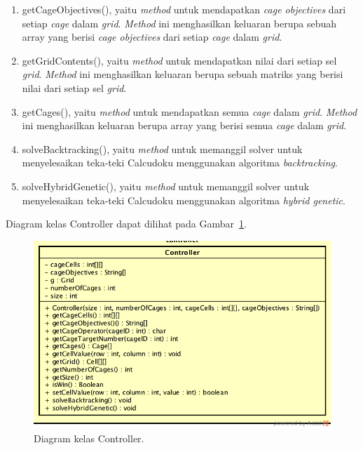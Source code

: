 \begin{enumerate}
\item getCageObjectives(), yaitu \textit{method} untuk mendapatkan \textit{cage objectives} dari setiap \textit{cage} dalam \textit{grid}. \textit{Method} ini menghasilkan keluaran berupa sebuah array yang berisi \textit{cage objectives} dari setiap \textit{cage} dalam \textit{grid}.
\item getGridContents(), yaitu \textit{method} untuk mendapatkan nilai dari setiap sel \textit{grid}. \textit{Method} ini menghasilkan keluaran berupa sebuah matriks yang berisi nilai dari setiap sel \textit{grid}.
\item getCages(), yaitu \textit{method} untuk mendapatkan semua \textit{cage} dalam \textit{grid}. \textit{Method} ini menghasilkan keluaran berupa array yang berisi semua \textit{cage} dalam \textit{grid}.
\item solveBacktracking(), yaitu \textit{method} untuk memanggil solver untuk menyelesaikan teka-teki Calcudoku menggunakan algoritma \textit{backtracking}. 
\item solveHybridGenetic(), yaitu \textit{method} untuk memanggil solver untuk menyelesaikan teka-teki Calcudoku menggunakan algoritma \textit{hybrid genetic}. 
\end{enumerate}

Diagram kelas Controller dapat dilihat pada Gambar~\ref{fig:diagramkelascontroller}.

\begin{figure}
\centering
\captionsetup{justification=centering}
\includegraphics[scale=0.5]{Gambar/Perancangan/DiagramKelasController.png}
\caption[Diagram kelas Controller.]{Diagram kelas Controller.}
\label{fig:diagramkelascontroller}
\end{figure}


